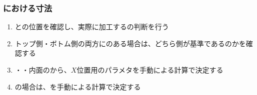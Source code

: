 \clearpage
\subsubsection{\OutcutMilling における寸法}
\begin{enumerate}[label=\sarrow]
\item \OutcutLength と\Keyway の位置を確認し、実際に加工する\OutcutLength の判断を行う
\item トップ側・ボトム側の両方に\Outcut のある場合は、どちら側が基準であるのかを確認する
\item \EndFaceID・\OutcutAsideThickness・内面の\PlatingThk から、\OutcutCenter$X$位置用のパラメタを手動による計算で決定する
\item \CurvedOutcut の場合は、\CurvedOutcutAngle を手動による計算で決定する
\end{enumerate}
